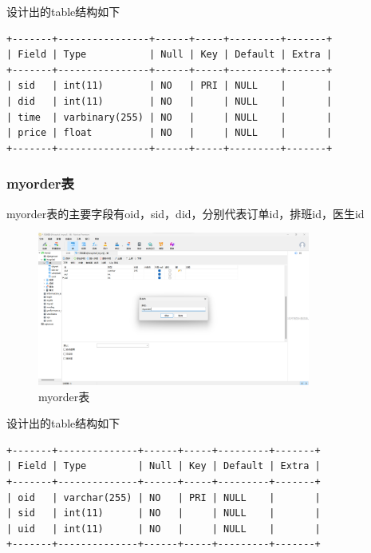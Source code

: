 \documentclass[UTF8,12pt]{article}
\begin{document}
设计出的table结构如下

\begin{lstlisting}[frame=shadowbox]
+-------+----------------+------+-----+---------+-------+
| Field | Type           | Null | Key | Default | Extra |
+-------+----------------+------+-----+---------+-------+
| sid   | int(11)        | NO   | PRI | NULL    |       |
| did   | int(11)        | NO   |     | NULL    |       |
| time  | varbinary(255) | NO   |     | NULL    |       |
| price | float          | NO   |     | NULL    |       |
+-------+----------------+------+-----+---------+-------+
\end{lstlisting}

\subsubsection{myorder表}

myorder表的主要字段有oid，sid，did，分别代表订单id，排班id，医生id

\newpage

\begin{figure}[htbp]
    \centering
    \includegraphics[width=0.8\textwidth]{imgs/9.png}
    \caption{myorder表}
\end{figure}

设计出的table结构如下

\begin{lstlisting}[frame=shadowbox]
+-------+--------------+------+-----+---------+-------+
| Field | Type         | Null | Key | Default | Extra |
+-------+--------------+------+-----+---------+-------+
| oid   | varchar(255) | NO   | PRI | NULL    |       |
| sid   | int(11)      | NO   |     | NULL    |       |
| uid   | int(11)      | NO   |     | NULL    |       |
+-------+--------------+------+-----+---------+-------+
\end{lstlisting}
\end{document}
